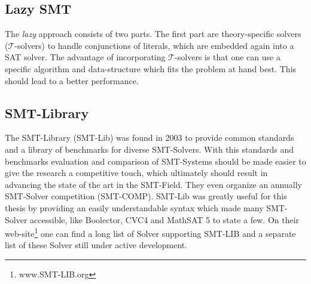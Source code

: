 \documentclass[a4paper,10pt]{paper}
\begin{document}
\subsection{Lazy SMT}
The \textit{lazy} approach consists of two parts. The first part are theory-specific solvers ($\mathcal{T}$-solvers) to handle conjunctions of literals, which are embedded again into a SAT solver. The advantage of incorporating $\mathcal{T}$-solvers is that one can use a specific algorithm and data-structure which fits the problem at hand best. This should lead to a better performance.\cite{sebastiani2007lazy}

\subsection{SMT-Library}
The SMT-Library (SMT-Lib) was found in 2003 to provide common standards and a library of benchmarks for diverse SMT-Solvers. With this standards and benchmarks evaluation and comparison of SMT-Systems should be made easier to give the research a competitive touch, which ultimately should result in advancing the state of the art in the SMT-Field. They even organize an annually SMT-Solver competition (SMT-COMP).
SMT-Lib was greatly useful for this thesis by providing an easily understandable syntax which made many SMT-Solver accessible, like Boolector, CVC4 and MathSAT 5 to state a few. On their web-site\footnote{www.SMT-LIB.org} one can find a long list of Solver supporting SMT-LIB and a separate list of these Solver still under active development.
\end{document}
